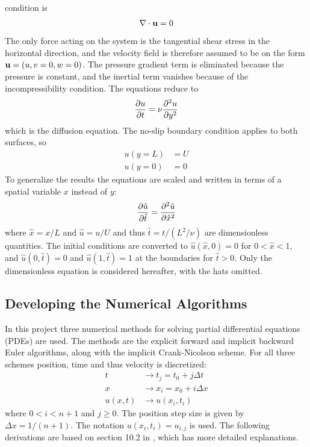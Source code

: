 \documentclass[aps,reprint]{revtex4-1}
\begin{document}
condition is
\begin{align*}
  \nabla \cdot \vb{u} = 0
\end{align*}
The only force acting on the system is the tangential shear stress in the
horizontal direction, and the velocity field is therefore assumed to be on the
form $\vb{u} = (u,v = 0,w = 0)$. The pressure gradient term is eliminated because the
pressure is constant, and the inertial term vanishes because of the incompressibility
condition. The equations reduce to
\begin{align}
  \pdv{u}{t} = \nu \pdv[2]{u}{y}
\end{align}
which is the diffusion equation. The no-slip boundary condition applies to both
surfaces, so
\begin{align*}
  u(y = L) &= U \\
  u(y = 0) &= 0
\end{align*}
To generalize the results the equations are scaled and written in terms of
a spatial variable $x$ instead of $y$:
\begin{align}
  \pdv{\hat{u}}{\hat{t}} = \pdv[2]{\hat{u}}{\hat{x}}
\end{align}
where $\hat{x} = x / L$ and $\hat{u} = u / U$ and thus $\hat{t} = t / (L^2 / \nu)$ are dimensionless quantities.
The initial conditions are converted to $\hat{u}(\hat{x},0) = 0$ for $0 < \hat{x} < 1$,
and $\hat{u}(0,\hat{t}) = 0$ and $\hat{u}(1,\hat{t}) = 1$ at the boundaries for $\hat{t} > 0$.
Only the dimensionless equation is considered hereafter, with the hats omitted.
\subsection{Developing the Numerical Algorithms}
In this project three numerical methods for solving partial differential equations (PDEs)
are used. The methods are the explicit forward and implicit backward Euler
algorithms, along with the implicit Crank-Nicolson scheme. For all three schemes
position, time and thus velocity is discretized:
\begin{align*}
  t &\rightarrow t_j = t_0 + j \Delta{t} \\
  x &\rightarrow x_i = x_0 + i \Delta{x} \\
  u(x,t) &\rightarrow u(x_i, t_i)
\end{align*}
where $0 < i < n + 1$ and $j \geq 0$. The position step size is given by $\Delta{x} = 1 /(n+1)$.
The notation $u(x_i,t_i) = u_{i,j}$ is used. The following derivations are based on
section 10.2 in \cite{mortenjensen}, which has more detailed explanations.
\end{document}
